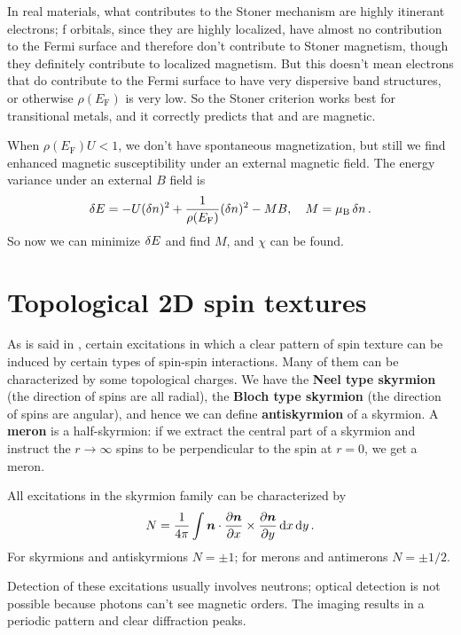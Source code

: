 \documentclass[hyperref, a4paper]{article}
\newcommand*{\concept}[1]{{\textbf{#1}}}
\newcommand*{\efermi}{E_{\text{F}}}
\begin{document}
In real materials, 
what contributes to the Stoner mechanism 
are highly itinerant electrons;
f orbitals, since they are highly localized, 
have almost no contribution to the Fermi surface 
and therefore don't contribute to Stoner magnetism,
though they definitely contribute to localized magnetism.
But this doesn't mean electrons that do contribute to the Fermi surface 
to have very dispersive band structures,
or otherwise $\rho(\efermi)$ is very low. 
So the Stoner criterion works best for transitional metals, 
and it correctly predicts that  and  are magnetic.

When $\rho(\efermi) U < 1$, 
we don't have spontaneous magnetization, 
but still we find enhanced magnetic susceptibility under an external magnetic field. 
The energy variance under an external $B$ field is 
\begin{equation}
    \var{E} = - U (\var{n})^2 
    + \frac{1}{\rho(\efermi)} (\var{n})^2
    - M B, \quad 
    M = \mu_\text{B} \var{n}.
\end{equation}
So now we can minimize $\var{E}$ and find $M$, 
and $\chi$ can be found. 

\section{Topological 2D spin textures}

As is said in , 
certain excitations in which a clear pattern of spin texture 
can be induced by certain types of spin-spin interactions.
Many of them can be characterized by 
some topological charges. 
We have the \concept{Neel type skyrmion} 
(the direction of spins are all radial), 
the \concept{Bloch type skyrmion}
(the direction of spins are angular),
and hence we can define 
\concept{antiskyrmion} of a skyrmion.
A \concept{meron} is a half-skyrmion: 
if we extract the central part of a skyrmion 
and instruct the $r \to \infty$ spins to be perpendicular to the spin at $r=0$,
we get a meron.

All excitations in the skyrmion family can be characterized by 
\begin{equation}
    N = \frac{1}{4\pi} \int \vb*{n} \cdot \pdv{\vb*{n}}{x} \times \pdv{\vb*{n}}{y} \dd{x} \dd{y}.
\end{equation}
For skyrmions and antiskyrmions $N = \pm 1$; 
for merons and antimerons $N = \pm 1/2$.

Detection of these excitations usually involves neutrons; 
optical detection is not possible 
because photons can't see magnetic orders.
The imaging results in a periodic pattern 
and clear diffraction peaks. 
\end{document}
